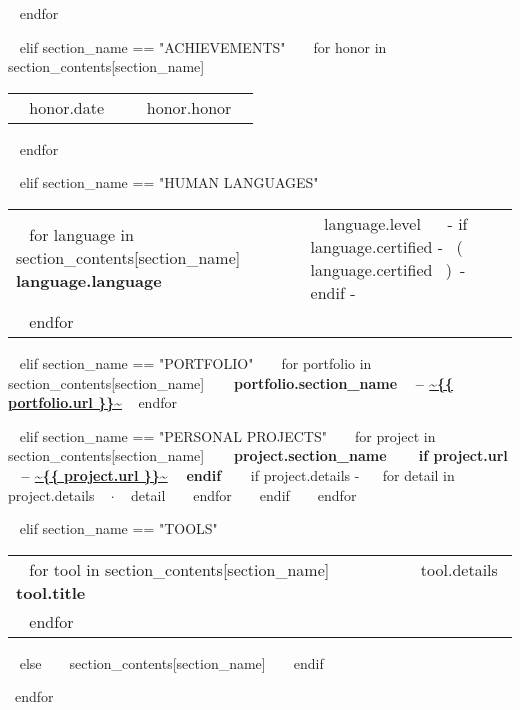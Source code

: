 \documentclass[11pt,english]{article}
\begin{document}
\begin{minipage}{\textwidth}
\begin{tabular}{ @{} p{32mm} p{135mm} @{} }
    \end{tabular}
    \vspace{1mm}
  ~{ endfor }~
  \vspace{4mm}

~{ elif section_name == "ACHIEVEMENTS" }~
  ~{ for honor in section_contents[section_name] }~
    \begin{tabular}{ @{} p{32mm} p{135mm} @{} }
    {~{{ honor.date }}~} & {\small ~{{ honor.honor }}~}
    \end{tabular}
    \vspace{1mm}
  ~{ endfor }~

~{ elif section_name == "HUMAN LANGUAGES" }~
  \begin{tabular}{ @{} p{32mm} p{135mm} @{} }
  ~{ for language in section_contents[section_name] }~
    \bf {~{{ language.language }}~} & {\small ~{{ language.level }}~ ~{- if language.certified -}~ \small\color{maingrey}\hspace{1mm}(~{{ language.certified }}~)~{- endif -}~} \\
  ~{ endfor }~
  \end{tabular}
  \vspace{50mm}

~{ elif section_name == "PORTFOLIO" }~
  ~{ for portfolio in section_contents[section_name] }~
    {\bf ~{{ portfolio.section_name }}~ -- \color{maincolor}\url{~{{ portfolio.url }}~} }
    \vspace{1mm}
  ~{ endfor }~
  \vspace{5mm}

~{ elif section_name == "PERSONAL PROJECTS" }~
  ~{ for project in section_contents[section_name] }~
    {\small\bf ~{{ project.section_name }}~ ~{ if project.url }~ -- \color{maincolor}\url{~{{ project.url }}~} ~{ endif }~ }
    \vspace{1mm}
    ~{ if project.details -}~
    ~{ for detail in project.details }~
      $\cdot$ \small ~{{ detail }}~
    ~{ endfor }~
    ~{ endif }~
    \vspace{3mm}
  ~{ endfor }~
  \vspace{15mm}

~{ elif section_name == "TOOLS" }~
  \begin{tabular}{ @{} p{32mm} p{135mm} @{} }
  ~{ for tool in section_contents[section_name] }~
    \bf\small ~{{ tool.title }}~ & {\small ~{{ tool.details }}~} \\
  ~{ endfor }~
  \end{tabular}
  \vspace{10mm}
~{ else }~
  ~{{ section_contents[section_name] }}~
  \bigskip
~{ endif }~

~{endfor}~

\end{minipage}
\end{document}
